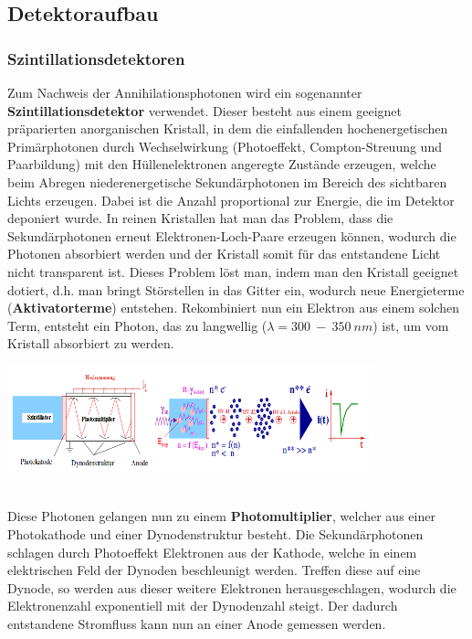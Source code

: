 \subsection{Detektoraufbau}
\subsubsection{Szintillationsdetektoren}
	Zum Nachweis der Annihilationsphotonen wird ein sogenannter \textbf{Szintillationsdetektor} verwendet. Dieser besteht aus einem geeignet präparierten anorganischen Kristall, in dem die einfallenden hochenergetischen Primärphotonen durch Wechselwirkung (Photoeffekt, Compton-Streuung und Paarbildung) mit den Hüllenelektronen angeregte Zustände erzeugen, welche beim Abregen niederenergetische Sekundärphotonen im Bereich des sichtbaren Lichts erzeugen. Dabei ist die Anzahl proportional zur Energie, die im Detektor deponiert wurde. In reinen Kristallen hat man das Problem, dass die Sekundärphotonen erneut Elektronen-Loch-Paare erzeugen können, wodurch die Photonen absorbiert werden und der Kristall somit für das entstandene Licht nicht transparent ist. Dieses Problem löst man, indem man den Kristall geeignet dotiert, d.h. man bringt Störstellen in das Gitter ein, wodurch neue Energieterme (\textbf{Aktivatorterme}) entstehen. Rekombiniert nun ein Elektron aus einem solchen Term, entsteht ein Photon, das zu langwellig ($\lambda = 300\ -\ 350\ \unit{nm}$) ist, um vom Kristall absorbiert zu werden.\\
	\minipanf
				\begin{center}
					\includegraphics[width=0.8\textwidth, height=0.15\textheight]{pic/szintillator.png}
					\label{PET-Prinzip}
				\end{center}
				\hspace{2mm}
	\minipend\\ 
	Diese Photonen gelangen nun zu einem \textbf{Photomultiplier}, welcher aus einer Photokathode und einer Dynodenstruktur besteht. Die Sekundärphotonen schlagen durch  Photoeffekt Elektronen aus der Kathode, welche in einem elektrischen Feld der Dynoden beschleunigt werden. Treffen diese auf eine Dynode, so werden aus dieser weitere Elektronen herausgeschlagen, wodurch die Elektronenzahl exponentiell mit der Dynodenzahl steigt. Der dadurch entstandene Stromfluss kann nun an einer Anode gemessen werden.\cite{info}

